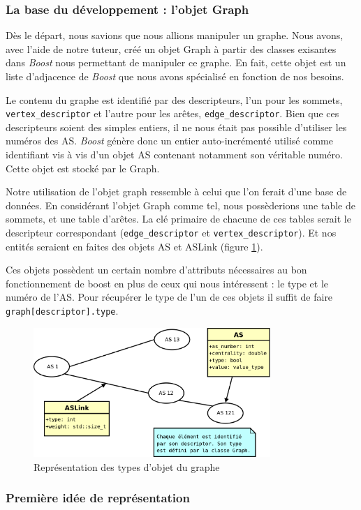 \subsubsection{La base du développement : l'objet Graph}

Dès le départ, nous savions que nous allions manipuler un graphe. Nous avons, avec l'aide de notre tuteur, créé un objet Graph à partir des classes exisantes dans \textit{Boost} nous permettant de manipuler ce graphe. En fait, cette objet est un liste d'adjacence de \textit{Boost} que nous avons spécialisé en fonction de nos besoins.

Le contenu du graphe est identifié par des descripteurs, l'un pour les sommets, \verb|vertex_descriptor| et l'autre pour les arêtes, \verb|edge_descriptor|. Bien que ces descripteurs soient des simples entiers, il ne nous était pas possible d'utiliser les numéros des AS. \textit{Boost} génère donc un entier auto-incrémenté utilisé comme identifiant vis à vis d'un objet AS contenant notamment son véritable numéro. Cette objet est stocké par le Graph.

Notre utilisation de l'objet graph ressemble à celui que l'on ferait d'une base de données. En considérant l'objet Graph comme tel, nous possèderions une table de sommets, et une table d'arêtes. La clé primaire de chacune de ces tables serait le descripteur correspondant (\verb|edge_descriptor| et \verb|vertex_descriptor|). Et nos entités seraient en faites des objets AS et ASLink (figure \ref{bdd}).

Ces objets possèdent un certain nombre d'attributs nécessaires au bon fonctionnement de boost en plus de ceux qui nous intéressent : le type et le numéro de l'AS. Pour récupérer le type de l'un de ces objets il suffit de faire \verb|graph[descriptor].type|.


\begin{figure}[H]
\begin{center}
        \includegraphics[width=0.8\textwidth]{./schema/bdd.png}
\caption{Représentation des types d'objet du graphe}
\label{bdd}
\end{center}
\end{figure}

\subsubsection{Première idée de représentation}
